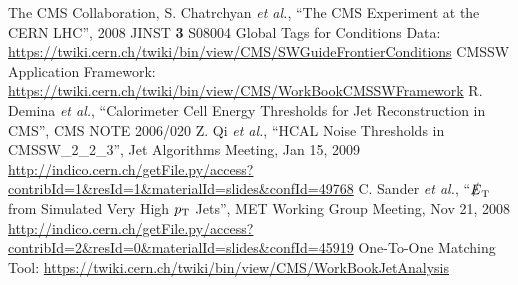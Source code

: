 \documentclass{cmspaper}
\begin{document}
\begin{thebibliography}{9}
 The CMS Collaboration, S. Chatrchyan \textit{et al.}, ``The CMS Experiment at the CERN LHC'', 2008 JINST \textbf{3} S08004
 Global Tags for Conditions Data: \href{https://twiki.cern.ch/twiki/bin/view/CMS/SWGuideFrontierConditions}{https://twiki.cern.ch/twiki/bin/view/CMS/SWGuideFrontierConditions}
 CMSSW Application Framework: \href{https://twiki.cern.ch/twiki/bin/view/CMS/WorkBookCMSSWFramework}{https://twiki.cern.ch/twiki/bin/view/CMS/WorkBookCMSSWFramework}
 R. Demina \textit{et al.}, ``Calorimeter Cell Energy Thresholds for Jet Reconstruction in CMS'', CMS NOTE 2006/020
 Z. Qi \textit{et al.}, ``HCAL Noise Thresholds in CMSSW\_2\_2\_3'', Jet Algorithms Meeting, Jan 15, 2009 \href{http://indico.cern.ch/getFile.py/access?contribId=1&resId=1&materialId=slides&confId=49768}{http://indico.cern.ch/getFile.py/access?contribId=1\&resId=1\&materialId=slides\&confId=49768}
 C. Sander \textit{et al.}, ``$\slashed E_\text T$ from Simulated Very High $p_\text T$ Jets'', MET Working Group Meeting, Nov 21, 2008 \href{http://indico.cern.ch/getFile.py/access?contribId=2&resId=0&materialId=slides&confId=45919}{http://indico.cern.ch/getFile.py/access?contribId=2\&resId=0\&materialId=slides\&confId=45919}
 One-To-One Matching Tool: \href{https://twiki.cern.ch/twiki/bin/view/CMS/WorkBookJetAnalysis}{https://twiki.cern.ch/twiki/bin/view/CMS/WorkBookJetAnalysis}
\end{thebibliography}
\end{document}
